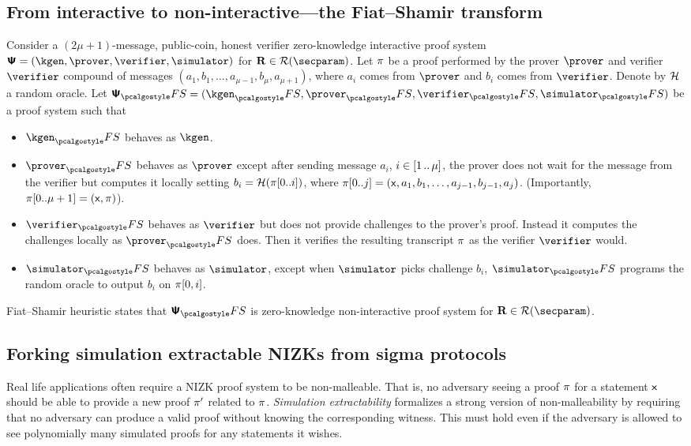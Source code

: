 \documentclass[runningheads,10pt]{llncs}
\begin{document}
\subsection{From interactive to non-interactive---the Fiat--Shamir transform}
Consider a $(2\mu + 1)$-message, public-coin, honest verifier zero-knowledge
interactive proof system
$\proofsystem = (\kgen, \prover, \verifier, \simulator)$ for
$\REL \in \RELGEN(\secparam)$.  Let $\pi$ be a proof performed by the
prover $\prover$ and verifier $\verifier$ compound of messages
$(a_1, b_1, \ldots, a_{\mu - 1}, b_{\mu}, a_{\mu + 1})$, where $a_i$ comes from
$\prover$ and $b_i$ comes from $\verifier$.  Denote by $\mathcal{H}$ a random oracle.
Let $\proofsystem_\fs = (\kgen_\fs, \prover_\fs, \verifier_\fs, \simulator_\fs)$
be a proof system such that
\begin{itemize}
  \item $\kgen_\fs$ behaves as $\kgen$.
  \item $\prover_\fs$ behaves as $\prover$ except after sending message
    $a_i$, $i \in [1 \, .. \, \mu]$, the prover does not wait for
    the message from the verifier but computes it locally setting $b_i
    = \mathcal{H}(\pi[0..i])$, where $\pi[0..j] = (\mathsf{x}, a_1, b_1, \ldots,
    a_{j - 1}, b_{j - 1}, a_j)$. (Importantly, $\pi[0..\mu + 1] =
    (\mathsf{x}, \pi)$).
  \item $\verifier_\fs$ behaves as $\verifier$ but does not provide
    challenges to the prover's proof. Instead it computes the
    challenges locally as $\prover_\fs$ does. Then it verifies the
    resulting transcript $\pi$ as the verifier $\verifier$ would. 
  \item $\simulator_\fs$ behaves as $\simulator$, except when
    $\simulator$ picks challenge $b_i$, $\simulator_\fs$ programs the
    random oracle to output $b_i$ on $\pi[0, i]$.
  \end{itemize}

Fiat--Shamir heuristic states that $\proofsystem_\fs$ is zero-knowledge
non-interactive proof system for $\REL \in \RELGEN(\secparam)$.

\subsection{Forking simulation extractable NIZKs from sigma protocols}
\label{sec:simext_def}
Real life applications often require a NIZK proof system to be
non-malleable. That is, no adversary seeing a proof $\pi$ for a statement
$\mathsf{x}$ should be able to provide a new proof $\pi'$ related to $\pi$.
\emph{Simulation extractability} formalizes a strong version of non-malleability
by requiring that no adversary can produce a valid proof without knowing the
corresponding witness. This must hold even if the adversary is allowed to see
polynomially many simulated proofs for any statements it wishes.
\end{document}
